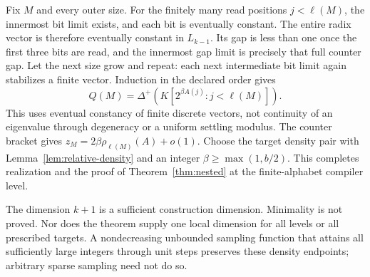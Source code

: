 Fix $M$ and every outer size. For the finitely many read positions
$j<\ell(M)$, the innermost bit limit exists, and each bit is eventually
constant. The entire radix vector is therefore eventually constant
in $L_{k-1}$. Its gap is less than one once the first three bits are
read, and the innermost gap limit is precisely that full counter gap.
Let the next size grow and repeat: each next intermediate bit limit
again stabilizes a finite vector. Induction in the declared order gives
\[
 Q(M)=\Delta^+(K[2^{\beta A(j)}:j<\ell(M)]).
\]
This uses eventual constancy of finite discrete vectors, not continuity
of an eigenvalue through degeneracy or a uniform settling modulus.
The counter bracket gives
$z_M=2\beta\rho_{\ell(M)}(A)+o(1)$. Choose the target density pair
with Lemma~\ref{lem:relative-density} and an integer
$\beta\geq\max(1,b/2)$. This completes realization and the proof of
Theorem~\ref{thm:nested} at the finite-alphabet compiler level.

The dimension $k+1$ is a sufficient construction dimension. Minimality
is not proved. Nor does the theorem supply one local dimension for
all levels or all prescribed targets. A nondecreasing unbounded
sampling function that attains all sufficiently large integers
through unit steps preserves these density endpoints; arbitrary sparse
sampling need not do so.

